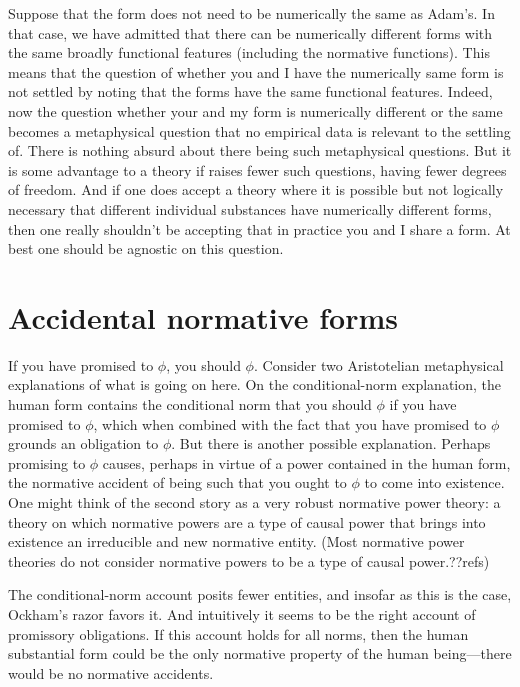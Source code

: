Suppose that the form does not need to be numerically the same as Adam's. In that case, we have admitted that there can 
be numerically different forms with the same broadly functional features (including the normative functions). This 
means that the question of whether you and I have the  numerically same form is not settled by noting that the forms have 
the same functional features. Indeed, now the question whether your and my form is numerically different or the same becomes
a metaphysical question that no empirical data is relevant to the settling of. There is nothing absurd about there being
such metaphysical questions. But it is some advantage to a theory if raises fewer such questions, having fewer degrees of 
freedom. And if one does accept a theory where it is possible but not logically necessary that different individual substances
have numerically different forms, then one really shouldn't be accepting that in practice you and I share a form. At best
one should be agnostic on this question.

\section{Accidental normative forms}
If you have promised to $\phi$, you should $\phi$. Consider two Aristotelian metaphysical explanations of what is going on here.
On the conditional-norm explanation, the human form contains the conditional norm that you should $\phi$ if you have promised 
to $\phi$, which when combined with the fact that you have promised to $\phi$ grounds an obligation to $\phi$. But there is
another possible explanation. Perhaps promising to $\phi$ causes, perhaps in virtue of a power contained in the human form, 
the normative accident of being such that you ought to $\phi$ to come into existence. One might think of the second story as 
a very robust normative power theory: a theory on which normative powers are a type of causal power that brings into existence
an irreducible and new normative entity. (Most normative power theories do not consider normative powers to be a type of 
causal power.??refs) 

The conditional-norm account posits fewer entities, and insofar as this is the case, Ockham's razor favors it. And intuitively
it seems to be the right account of promissory obligations. If this account holds for all norms, then the human substantial form could be 
the only normative property of the human being---there would be no normative accidents.


